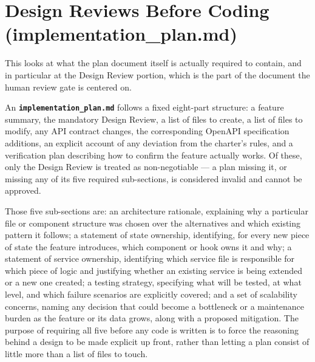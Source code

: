 \section{Design Reviews Before Coding (implementation\_plan.md)}

This looks at what the plan document itself is actually required to contain, and in particular at the Design Review portion, which is the part of the document the human review gate is centered on.

An \textbf{\texttt{implementation\_plan.md}} follows a fixed eight-part structure: a feature summary, the mandatory Design Review, a list of files to create, a list of files to modify, any API contract changes, the corresponding OpenAPI specification additions, an explicit account of any deviation from the charter's rules, and a verification plan describing how to confirm the feature actually works. Of these, only the Design Review is treated as non-negotiable --- a plan missing it, or missing any of its five required sub-sections, is considered invalid and cannot be approved.

Those five sub-sections are: an architecture rationale, explaining why a particular file or component structure was chosen over the alternatives and which existing pattern it follows; a statement of state ownership, identifying, for every new piece of state the feature introduces, which component or hook owns it and why; a statement of service ownership, identifying which service file is responsible for which piece of logic and justifying whether an existing service is being extended or a new one created; a testing strategy, specifying what will be tested, at what level, and which failure scenarios are explicitly covered; and a set of scalability concerns, naming any decision that could become a bottleneck or a maintenance burden as the feature or its data grows, along with a proposed mitigation. The purpose of requiring all five before any code is written is to force the reasoning behind a design to be made explicit up front, rather than letting a plan consist of little more than a list of files to touch.

